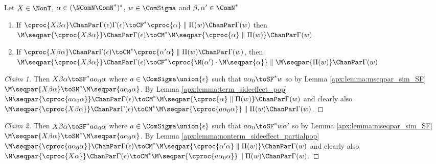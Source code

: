 \begin{lemma}\label{apx:lemma:sim_fromcom_pop_or_nonterm}
Let $X \in \NonT$, $\alpha \in (\NComN\ComN^*)^*$, $w \in \ComSigma$ and $\beta,\alpha' \in \ComN^*$
\begin{enumerate}
	\item If $\cproc{X\beta\alpha} \ChanPar \Gamma(\epsilon) \Gamma(\epsilon) \toCF^* \cproc{\alpha} \parallel \Pi(w) \ChanPar \Gamma(w)$
	      then 
	      ${\M\seqpar{\cproc{X\beta\alpha}} \ChanPar \Gamma(\epsilon) \toCM^* \M\seqpar{\cproc{\alpha} \parallel \Pi(w)} \ChanPar \Gamma(w)}$
	\item If $\cproc{X\beta\alpha} \ChanPar \Gamma(\epsilon) \toCM^* \cproc{\alpha'\alpha} \parallel \Pi(w) \ChanPar \Gamma(w) $, then $\M\seqpar{\cproc{X\beta\alpha}} \ChanPar \Gamma(\epsilon) \toCF^* {\cproc{\M(\alpha')\cdot\M\seqpar{\alpha}}} \parallel \M\seqpar{\Pi(w)} \ChanPar \Gamma(w)$
\end{enumerate}
\end{lemma}
\begin{proof}[Claim 1]
Then $X\beta\alpha \toSF^* a\alpha_0\alpha$ where 
$a \in \ComSigma \union \{\epsilon\}$ such that $a\alpha_0 \toSF^* w$ 
so by Lemma \ref{apx:lemma:mseqpar_sim_SF} $\M\seqpar{X\beta\alpha} \toSM^* \M\seqpar{a\alpha_0\alpha}$.
By Lemma \ref{apx:lemma:term_sideeffect_pop}
$\M\seqpar{\cproc{a\alpha_0\alpha}} \ChanPar \Gamma(\epsilon) \toCM^* \M\seqpar{\cproc{\alpha} \parallel \Pi(w)} \ChanPar \Gamma(w)$ and clearly also $\M\seqpar{\cproc{X\beta\alpha}} \ChanPar \Gamma(\epsilon) \toCM^* \M\seqpar{\cproc{a\alpha_0\alpha}} \parallel \Pi(w) \ChanPar \Gamma(w)$.
\end{proof}
\begin{proof}[Claim 2]
Then $X\beta\alpha \toSF^* a\alpha_0\alpha$ where 
$a \in \ComSigma \union \{\epsilon\}$ such that $a\alpha_0 \toSF^* w\alpha'$ 
so by Lemma \ref{apx:lemma:mseqpar_sim_SF} $\M\seqpar{X\beta\alpha} \toSM^* \M\seqpar{a\alpha_0\alpha}$.
By Lemma \ref{apx:lemma:nonterm_sideeffect_partialpop}
$\M\seqpar{\cproc{a\alpha_0\alpha}} \ChanPar \Gamma(\epsilon) \toCM^* \M\seqpar{\cproc{\alpha'\alpha} \parallel \Pi(w)} \ChanPar \Gamma(w)$ and clearly also $\M\seqpar{\cproc{X\alpha}} \ChanPar \Gamma(\epsilon) \toCM^* \M\seqpar{\cproc{a\alpha_0\alpha}} \parallel \Pi(w) \ChanPar \Gamma(w)$.
\end{proof}

